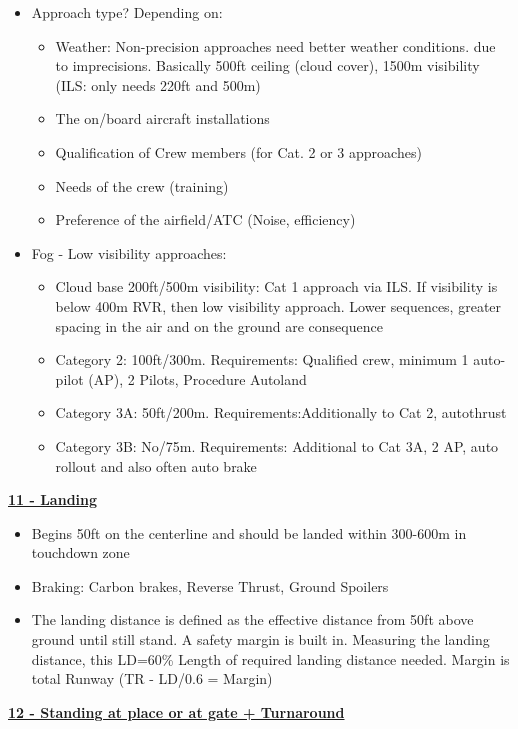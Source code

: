 \documentclass[9pt, landscape, fleqn]{scrartcl}
\begin{document}
\begin{multicols*}{3}
\begin{itemize}
\begin{itemize}
    \end{itemize}
    \item Approach type? Depending on:
    \begin{itemize}
        \item Weather: Non-precision approaches need better weather conditions. due to imprecisions. Basically 500ft ceiling (cloud cover), 1500m visibility (ILS: only needs 220ft and 500m)
        \item The on/board aircraft installations 
        \item Qualification of Crew members (for Cat. 2 or 3 approaches)
        \item Needs of the crew (training)
        \item Preference of the airfield/ATC (Noise, efficiency)
    \end{itemize}
    \item Fog - Low visibility approaches:
    \begin{itemize}
        \item Cloud base 200ft/500m visibility: Cat 1 approach via ILS. If visibility is below 400m RVR, then low visibility approach. Lower sequences, greater spacing in the air and on the ground are consequence
        \item Category 2: 100ft/300m. Requirements: Qualified crew, minimum 1 auto-pilot (AP), 2 Pilots, Procedure Autoland
        \item Category 3A: 50ft/200m. Requirements:Additionally to Cat 2, autothrust 
        \item Category 3B: No/75m. Requirements: Additional to Cat 3A, 2 AP, auto rollout and also often auto brake 
    \end{itemize}
\end{itemize}
\underline{\textbf{11 - Landing}}
\begin{itemize}
    \item Begins 50ft on the centerline and should be landed within 300-600m in touchdown zone 
    \item Braking: Carbon brakes, Reverse Thrust, Ground Spoilers 
    \item The landing distance is defined as the effective distance from 50ft above ground until still stand. A safety margin is built in. Measuring the landing distance, this LD=60\% Length of required landing distance needed. Margin is total Runway (TR - LD/0.6 = Margin)
\end{itemize}
\underline{\textbf{12 - Standing at place or at gate + Turnaround}}

\end{multicols*}
\end{document}
